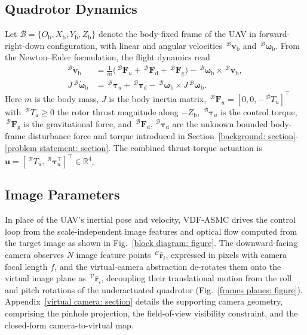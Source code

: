 \documentclass{IEEEtaes}
\begin{document}
\subsection{Quadrotor Dynamics} \label{quadrotor dynamics: section}
Let $\mathcal{B}=\{O_{\text{b}},X_{\text{b}},Y_{\text{b}},Z_{\text{b}}\}$ denote the body-fixed frame of the UAV in forward-right-down configuration, with linear and angular velocities $\,^\mathcal{B}\boldsymbol{v}_\text{b}$ and $\,^\mathcal{B}\boldsymbol{\omega}_\text{b}$. From the Newton--Euler formulation, the flight dynamics read
\begin{equation}
\label{quadrotor dynamics: equation}
    \begin{aligned}
    ^\mathcal{B}\dot{\boldsymbol{v}}_\text{b} &= \tfrac{1}{m}\big(\,^\mathcal{B}\boldsymbol{F}_u + \,^\mathcal{B}\boldsymbol{F}_\text{d} + \,^\mathcal{B}\boldsymbol{F}_\text{g}\big) - \,^\mathcal{B}\boldsymbol{\omega}_\text{b}\times\,^\mathcal{B}\boldsymbol{v}_\text{b},\\
    J\,^\mathcal{B}\dot{\boldsymbol{\omega}}_\text{b} &= \,^\mathcal{B}\boldsymbol{\tau}_u + \,^\mathcal{B}\boldsymbol{\tau}_\text{d} - \,^\mathcal{B}\boldsymbol{\omega}_\text{b}\times J\,^\mathcal{B}\boldsymbol{\omega}_\text{b}.
    \end{aligned}
 \end{equation}
Here $m$ is the body mass, $J$ is the body inertia matrix, $\,^\mathcal{B} \boldsymbol{F}_u = [0,0,-\,^\mathcal{B} T_u]^\top$ with $\,^\mathcal{B} T_u\ge 0$ the rotor thrust magnitude along $-Z_\text{b}$, $\,^\mathcal{B} \boldsymbol{\tau}_u$ is the control torque, $\,^\mathcal{B} \boldsymbol{F}_\text{g}$ is the gravitational force, and $\,^\mathcal{B} \boldsymbol{F}_\text{d},\,^\mathcal{B} \boldsymbol{\tau}_\text{d}$ are the unknown bounded body-frame disturbance force and torque introduced in Section~\ref{background: section}-\ref{problem statement: section}. The combined thrust-torque actuation is $\boldsymbol{u}=[\,^\mathcal{B}T_u,\,^\mathcal{B}\boldsymbol{\tau}_u^\top]^\top\in\mathbb{R}^4$.

\subsection{Image Parameters} \label{image parameters: section}
In place of the UAV's inertial pose and velocity, VDF-ASMC drives the control loop from the scale-independent image features and optical flow computed from the target image as shown in Fig.~\ref{block diagram: figure}. The downward-facing camera observes $N$ image feature points $\,^\mathcal{C}\hat{\boldsymbol{r}}_i$, expressed in pixels with camera focal length $f$, and the virtual-camera abstraction de-rotates them onto the virtual image plane as $\,^\mathcal{V}\hat{\boldsymbol{r}}_i$, decoupling their translational motion from the roll and pitch rotations of the underactuated quadrotor (Fig.~\ref{frames planes: figure}). Appendix~\ref{virtual camera: section} details the supporting camera geometry, comprising the pinhole projection, the field-of-view visibility constraint, and the closed-form camera-to-virtual map.
\end{document}
